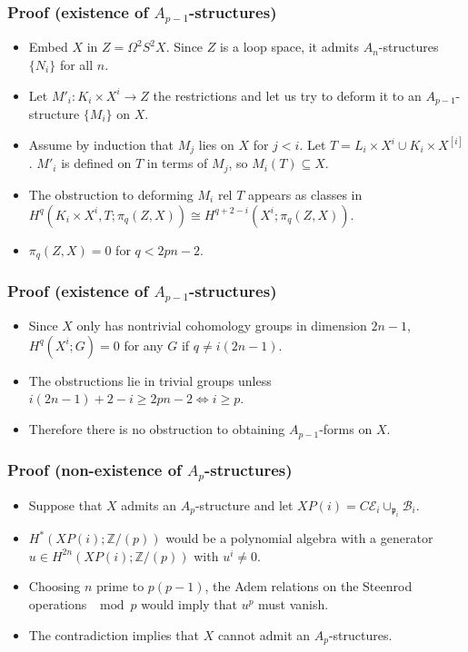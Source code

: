 \documentclass{beamer}
\theoremstyle{definition}
\newcommand{\Z}{\mathbb{Z}}
\begin{document}
\begin{frame}
\frametitle{Proof (existence of $A_{p-1}$-structures)}
\begin{itemize}
\item<1-> Embed $X$ in $Z=\Omega^2S^2X$. Since $Z$ is a loop space, it admits $A_n$-structures $\{N_i\}$ for all $n$.
\item<2-> Let $M'_i:K_i\times X^i\to Z$ the restrictions and let us try to deform it to an $A_{p-1}$-structure $\{M_i\}$ on $X$.
\item<3-> Assume by induction that $M_j$ lies on $X$ for $j<i$. Let $T=L_i\times X^i\cup K_i\times X^{[i]}$. $M'_i$ is defined on $T$ in terms of $M_j$, so $M_i(T)\subseteq X$. %
\item<4-> The obstruction to deforming $M_i$ rel $T$ appears as classes in $H^q(K_i\times X^i,T;\pi_q(Z,X))\cong H^{q+2-i}(X^i;\pi_q(Z,X))$.
\item<5-> $\pi_q(Z,X)=0$ for $q<2pn-2$.

\end{itemize}
\end{frame}
\begin{frame}
\frametitle{Proof (existence of $A_{p-1}$-structures)}
\begin{itemize}
\item<1-> Since $X$ only has nontrivial cohomology groups in dimension $2n-1$, $H^q(X^i;G)=0$ for any $G$ if $q\neq i(2n-1)$. %
\item<2-> The obstructions lie in trivial groups unless $i(2n-1)+2-i\geq 2pn-2\Leftrightarrow i\geq p$.
\item<3-> Therefore there is no obstruction to obtaining $A_{p-1}$-forms on $X$.
\end{itemize}
\end{frame}
\begin{frame}
\frametitle{Proof (non-existence of $A_{p}$-structures)}
\begin{itemize}
\item<1-> Suppose that $X$ admits an $A_p$-structure and let $XP(i)=C\mathcal{E}_i\cup_{\mathfrak{p}_i}\mathcal{B}_i$.
\item<2-> $H^*(XP(i);\Z/(p))$ would be a polynomial algebra with a generator $u\in H^{2n}(XP(i);\Z/(p))$ with $u^i\neq 0$.
\item<3-> Choosing $n$ prime to $p(p-1)$, the Adem relations on the Steenrod operations $\mod p$ would imply that $u^p$ must vanish. %
\item<4-> The contradiction implies that $X$ cannot admit an $A_{p}$-structures.
\end{itemize}
\end{frame}
\end{document}
